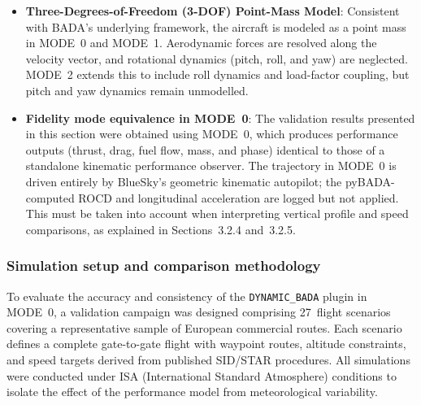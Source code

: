 \begin{itemize}
    \item \textbf{Three-Degrees-of-Freedom (3-DOF) Point-Mass Model}: Consistent with BADA's underlying framework, the aircraft is modeled as a point mass in MODE~0 and MODE~1. Aerodynamic forces are resolved along the velocity vector, and rotational dynamics (pitch, roll, and yaw) are neglected. MODE~2 extends this to include roll dynamics and load-factor coupling, but pitch and yaw dynamics remain unmodelled.

    \item \textbf{Fidelity mode equivalence in MODE~0}: The validation results presented in this section were obtained using MODE~0, which produces performance outputs (thrust, drag, fuel flow, mass, and phase) identical to those of a standalone kinematic performance observer. The trajectory in MODE~0 is driven entirely by BlueSky's geometric kinematic autopilot; the pyBADA-computed ROCD and longitudinal acceleration are logged but not applied. This must be taken into account when interpreting vertical profile and speed comparisons, as explained in Sections~3.2.4 and~3.2.5.
\end{itemize}

\subsubsection{Simulation setup and comparison methodology}
To evaluate the accuracy and consistency of the \texttt{DYNAMIC\_BADA} plugin in MODE~0, a validation campaign was designed comprising 27~flight scenarios covering a representative sample of European commercial routes. Each scenario defines a complete gate-to-gate flight with waypoint routes, altitude constraints, and speed targets derived from published SID/STAR procedures. All simulations were conducted under ISA (International Standard Atmosphere) conditions to isolate the effect of the performance model from meteorological variability.

